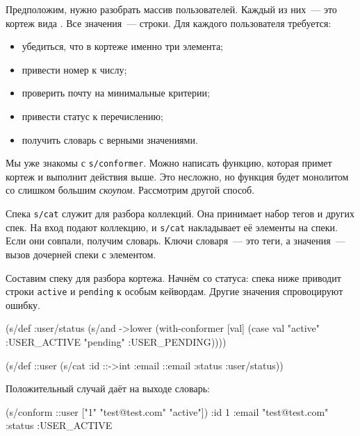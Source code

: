 Предположим, нужно разобрать массив пользователей. Каждый из них~--- это кортеж вида
. Все значения~--- строки. Для каждого пользователя
требуется:

\begin{itemize}

\item
  убедиться, что в кортеже именно три элемента;

\item
  привести номер к числу;

\item
  проверить почту на минимальные критерии;

\item
  привести статус к перечислению;

\item
  получить словарь с верными значениями.

\end{itemize}

Мы уже знакомы с \verb|s/conformer|. Можно написать функцию, которая примет
кортеж и выполнит действия выше. Это несложно, но функция будет монолитом со
слишком большим \emph{скоупом}. Рассмотрим другой способ.


Спека \verb|s/cat| служит для разбора коллекций. Она принимает набор тегов и
других спек. На вход подают коллекцию, и \verb|s/cat| накладывает её элементы на
спеки. Если они совпали, получим словарь. Ключи словаря~--- это теги, а значения~---
вызов дочерней спеки с элементом.

Составим спеку для разбора кортежа. Начнём со статуса: спека ниже приводит
строки \verb|active| и \verb|pending| к особым кейвордам. Другие значения
спровоцируют ошибку.

\begin{english}
  \begin{clojure}
(s/def :user/status
  (s/and ->lower
         (with-conformer [val]
           (case val
             "active"  :USER_ACTIVE
             "pending" :USER_PENDING))))

(s/def ::user
  (s/cat :id ::->int
         :email ::email
         :status :user/status))
  \end{clojure}
\end{english}

\noindent
Положительный случай даёт на выходе словарь:

\ifx\DEVICETYPE\MOBILE

\begin{english}
  \begin{clojure}
(s/conform ::user
  ["1" "test@test.com" "active"])
{:id 1
 :email "test@test.com"
 :status :USER_ACTIVE}
  \end{clojure}
\end{english}


